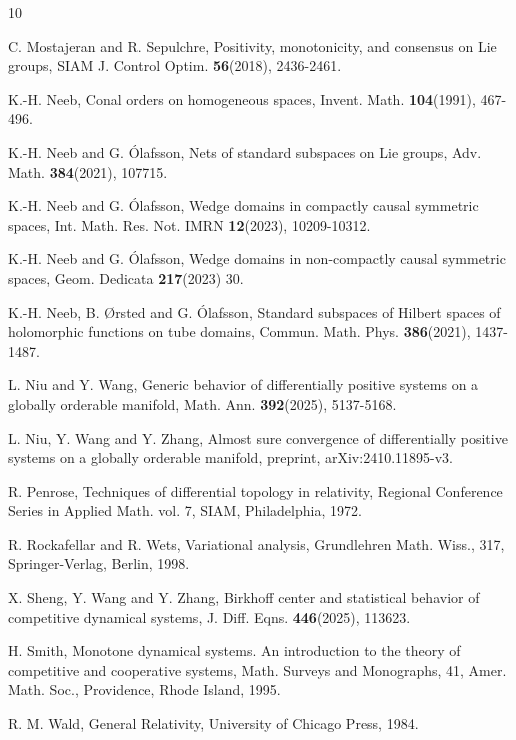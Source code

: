 \documentclass[a4paper,11pt]{article}
\theoremstyle{plain}
\theoremstyle{definition}
\numberwithin{equation}{section}
\begin{document}
\begin{thebibliography}{10}
		
		C. Mostajeran and R. Sepulchre, \rm{Positivity, monotonicity, and consensus on Lie groups}, SIAM J. Control Optim. \textbf{56}(2018), 2436-2461.
		
		
		K.-H. Neeb, \rm{Conal orders on homogeneous spaces},
		Invent. Math. \textbf{104}(1991), 467-496.
		
		
		K.-H. Neeb and G. \'{O}lafsson, \rm{Nets of standard subspaces on Lie groups},
		Adv. Math. \textbf{384}(2021), 107715.
		
		
		
		K.-H. Neeb and G. \'{O}lafsson, \rm{Wedge domains in compactly causal symmetric spaces},
		Int. Math. Res. Not. IMRN \textbf{12}(2023), 10209-10312.
		
		
		
		K.-H. Neeb and G. \'{O}lafsson, \rm{Wedge domains in non-compactly causal symmetric spaces},
		Geom. Dedicata \textbf{217}(2023) 30.
		
		
		
		K.-H. Neeb, B. \O rsted and G. \'{O}lafsson, \rm{Standard subspaces of Hilbert spaces of holomorphic functions on tube domains},
		Commun. Math. Phys. \textbf{386}(2021), 1437-1487.
		
				
		
		L. Niu and Y. Wang, \rm{Generic behavior of differentially positive systems on a globally orderable manifold},
		Math. Ann. \textbf{392}(2025), 5137-5168.
		
		L. Niu, Y. Wang and Y. Zhang, \rm{Almost sure convergence of differentially positive systems on a globally orderable manifold},
		preprint, arXiv:2410.11895-v3.
		
		R. Penrose, \rm{Techniques of differential topology in relativity},
		Regional Conference Series in Applied Math. vol. 7, SIAM, Philadelphia, 1972.
		
		
		R. Rockafellar and R. Wets, \rm{Variational analysis}, Grundlehren Math. Wiss., 317, Springer-Verlag, Berlin, 1998.
		
		X. Sheng, Y. Wang and Y. Zhang, \rm{Birkhoff center and statistical behavior of competitive dynamical systems},  J. Diff. Eqns. \textbf{446}(2025), 113623.
		
		H. Smith, \rm{Monotone dynamical systems. An introduction to the theory of competitive and cooperative systems}, Math. Surveys and Monographs, 41, Amer. Math. Soc., Providence, Rhode Island, 1995.
		
		
		R. M. Wald, \rm{General Relativity}, University of Chicago Press, 1984.
		
		
	\end{thebibliography}
	
\end{document}
